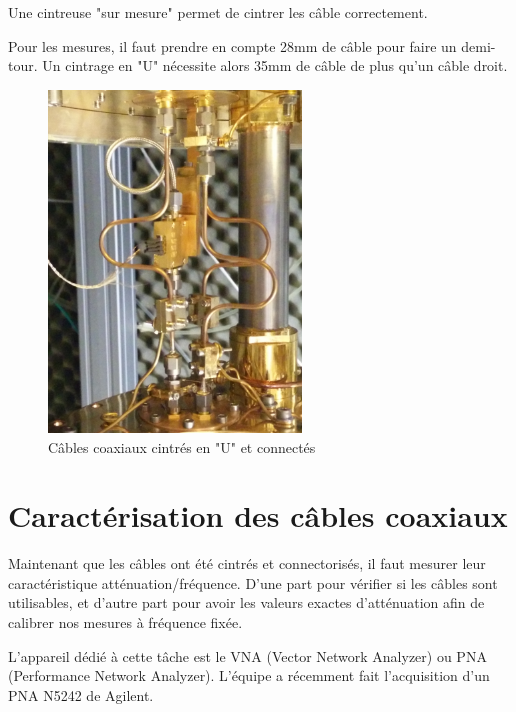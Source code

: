Une cintreuse "sur mesure" permet de cintrer les câble correctement.

Pour les mesures, il faut prendre en compte 28mm de câble pour faire un demi-tour. Un cintrage en "U" nécessite alors 35mm de câble de plus qu'un câble droit.

\begin{figure}[h]
    \begin{center}
        \includegraphics[width=0.60\textwidth]{Images/Coax/cintrage}
        \caption{Câbles coaxiaux cintrés en "U" et connectés}
        \label{coax_cintrage}
    \end{center}
\end{figure}




\newpage
\section{Caractérisation des câbles coaxiaux}

Maintenant que les câbles ont été cintrés et connectorisés, il faut mesurer leur caractéristique atténuation/fréquence. D'une part pour vérifier si les câbles sont utilisables, et d'autre part pour avoir les valeurs exactes d'atténuation afin de calibrer nos mesures à fréquence fixée.

L'appareil dédié à cette tâche est le VNA (Vector Network Analyzer) ou PNA (Performance Network Analyzer). L'équipe a récemment fait l'acquisition d'un PNA N5242 de Agilent.

